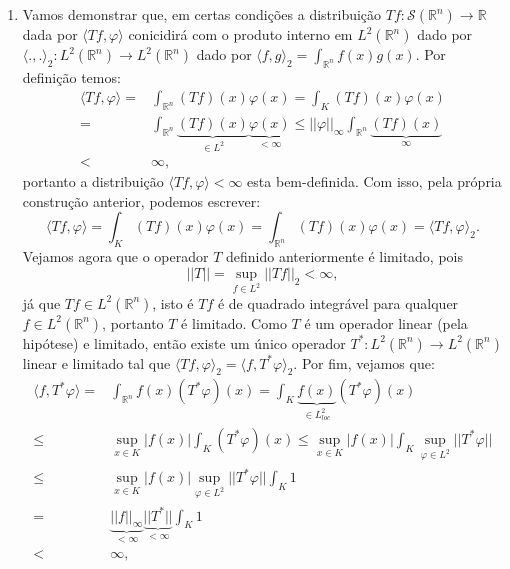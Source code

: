 \documentclass{article}
\begin{document}
\begin{enumerate}
\begin{enumerate}
				\item Vamos demonstrar que, em certas condições a distribuição $Tf: \mathcal{S}(\mathbb{R}^{n}) \to \mathbb{R}$ dada por $\langle Tf, \varphi \rangle$ conicidirá com o produto interno em $L^{2}(\mathbb{R}^{n})$ dado por $\langle .,.\rangle_{2} : L^{2}(\mathbb{R}^{n}) \to L^{2}(\mathbb{R}^{n})$ dado por $\langle f, g \rangle_{2} = \int_{\mathbb{R}^{n}} f(x)g(x)$. Por definição temos:
				$$
				\begin{aligned}
				\langle Tf, \varphi \rangle = & \int_{\mathbb{R}^{n}} (Tf)(x)\varphi(x) = \int_{K} (Tf)(x)\varphi(x)
				\\
				= & \int_{\mathbb{R}^{n}} \underbrace{ (Tf)(x) }_{\in L^{2}} \underbrace{ \varphi(x) }_{<\infty} \leq ||\varphi||_{\infty} \int_{\mathbb{R}^{n}} \underbrace{ (Tf)(x) }_{\infty}
				\\
				< & \infty,
				\end{aligned}
				$$
				portanto  a distribuição $\langle Tf, \varphi \rangle < \infty$ esta bem-definida. Com isso, pela própria construção anterior, podemos escrever:
				$$
				\langle Tf, \varphi \rangle = \int_{K} (Tf)(x)\varphi(x) = \int_{\mathbb{R}^{n}} (Tf)(x)\varphi(x)  = \langle Tf, \varphi \rangle_{2}.
				$$
				Vejamos agora que o operador $T$ definido anteriormente é limitado, pois 
				$$
				||T|| = \sup_{f \in L^{2}}||Tf||_{2} < \infty,
				$$
				já que $Tf \in L^{2}(\mathbb{R}^{n})$, isto é $Tf$ é de quadrado integrável para qualquer $f \in L^{2}(\mathbb{R}^{n})$, portanto $T$ é limitado.  Como $T$ é um operador linear (pela hipótese) e limitado, então existe um único operador $T^{*} : L^{2}(\mathbb{R}^{n}) \to L^{2}(\mathbb{R}^{n})$ linear e limitado tal que $\langle Tf, \varphi \rangle_{2} = \langle f, T^{*}\varphi \rangle_{2}$. Por fim, vejamos que:
				$$
				\begin{aligned}
				\langle f, T^{*}\varphi \rangle = & \int_{\mathbb{R}^{n}} f(x)(T^{*}\varphi)(x) = \int_{K} \underbrace{ f(x) }_{\in L^{2}_{loc}} (T^{*}\varphi)(x)
				\\
				\leq & \sup_{x \in K}|f(x)| \int_{K} (T^{*}\varphi)(x) 	\leq \sup_{x \in K}|f(x)| \int_{K} \sup_{\varphi \in L^{2}} ||T^{*}\varphi||
				\\
				\leq & \sup_{x \in K}|f(x)| \sup_{\varphi \in L^{2}} ||T^{*}\varphi|| \int_{K} 1 
				\\
				= & \underbrace{ ||f||_{\infty} }_{<\infty} \underbrace{ ||T^{*}|| }_{< \infty} \int_{K} 1 
				\\
				< & \infty,
				\end{aligned}
$$
\end{enumerate}
\end{enumerate}
\end{document}
